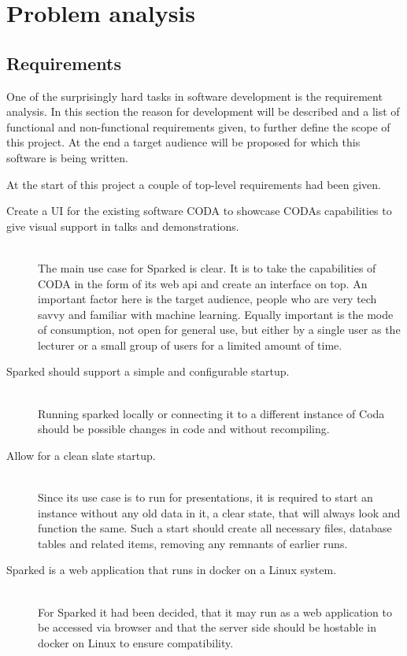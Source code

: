 \chapter{Problem analysis}

\section{Requirements}
One of the surprisingly hard tasks in software development is the requirement analysis. In this section the reason for development will be described and a list of functional and non-functional requirements given, to further define the scope of this project. At the end a target audience will be proposed for which this software is being written. 

At the start of this project a couple of top-level requirements had been given.
\begin{description}
\item [Create a UI for the existing software CODA to showcase CODAs capabilities to give visual support in talks and demonstrations.]\hfill \\
The main use case for Sparked is clear. It is to take the capabilities of CODA in the form of its web api and create an interface on top. An important factor here is the target audience, people who are very tech savvy and familiar with machine learning. Equally important is the mode of consumption, not open for general use, but either by a single user as the lecturer or a small group of users for a limited amount of time. 
\end{description}


\begin{description}
\item [Sparked should support a simple and configurable startup.]\hfill \\
Running sparked locally or connecting it to a different instance of Coda should be possible changes in code and without recompiling.
\item [Allow for a clean slate startup.]\hfill \\
Since its use case is to run for presentations, it is required to start an instance without any old data in it, a clear state, that will always look and function the same. Such a start should create all necessary files, database tables and related items, removing any remnants of earlier runs.
\end{description}

\begin{description}
\item [Sparked is a web application that runs in docker on a Linux system.]\hfill \\
For Sparked it had been decided, that it may run as a web application to be accessed via browser and that the server side should be hostable in docker on Linux to ensure compatibility.
\end{description}

